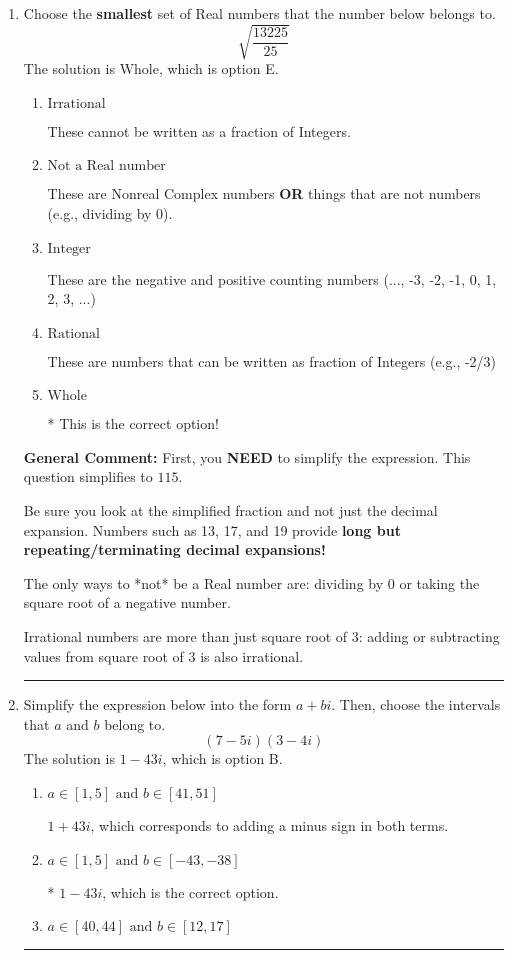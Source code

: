 \documentclass{extbook}[14pt]
\newcommand{\litem}[1]{\item #1

\rule{\textwidth}{0.4pt}}
\begin{document}
\begin{enumerate}\litem{
Choose the \textbf{smallest} set of Real numbers that the number below belongs to.
\[ \sqrt{\frac{13225}{25}} \]The solution is \( \text{Whole} \), which is option E.\begin{enumerate}[label=\Alph*.]
\item \( \text{Irrational} \)

These cannot be written as a fraction of Integers.
\item \( \text{Not a Real number} \)

These are Nonreal Complex numbers \textbf{OR} things that are not numbers (e.g., dividing by 0).
\item \( \text{Integer} \)

These are the negative and positive counting numbers (..., -3, -2, -1, 0, 1, 2, 3, ...)
\item \( \text{Rational} \)

These are numbers that can be written as fraction of Integers (e.g., -2/3)
\item \( \text{Whole} \)

* This is the correct option!
\end{enumerate}

\textbf{General Comment:} First, you \textbf{NEED} to simplify the expression. This question simplifies to $115$. 
 
 Be sure you look at the simplified fraction and not just the decimal expansion. Numbers such as 13, 17, and 19 provide \textbf{long but repeating/terminating decimal expansions!} 
 
 The only ways to *not* be a Real number are: dividing by 0 or taking the square root of a negative number. 
 
 Irrational numbers are more than just square root of 3: adding or subtracting values from square root of 3 is also irrational.
}
\litem{
Simplify the expression below into the form $a+bi$. Then, choose the intervals that $a$ and $b$ belong to.
\[ (7 - 5 i)(3 - 4 i) \]The solution is \( 1 - 43 i \), which is option B.\begin{enumerate}[label=\Alph*.]
\item \( a \in [1, 5] \text{ and } b \in [41, 51] \)

 $1 + 43 i$, which corresponds to adding a minus sign in both terms.
\item \( a \in [1, 5] \text{ and } b \in [-43, -38] \)

* $1 - 43 i$, which is the correct option.
\item \( a \in [40, 44] \text{ and } b \in [12, 17] \)


\end{enumerate}}
\end{enumerate}
\end{document}
